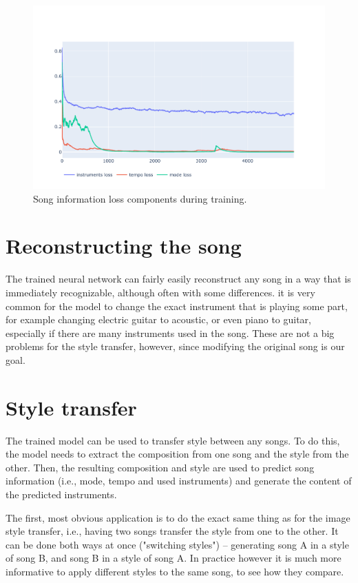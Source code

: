 \documentclass[en]{pracamgr}
\begin{document}
\begin{figure}
    \centering
    \includegraphics[width=\linewidth]{figures/song-info.pdf}
    \caption{Song information loss components during training.}
    \label{fig:song_info}
\end{figure}

\section{Reconstructing the song}

The trained neural network can fairly easily reconstruct any song in a way that is immediately recognizable, although often with some differences.
it is very common for the model to change the exact instrument that is playing some part, for example changing electric guitar to acoustic, or even piano to guitar, especially if there are many instruments used in the song.
These are not a big problems for the style transfer, however, since modifying the original song is our goal.

\section{Style transfer}

The trained model can be used to transfer style between any songs.
To do this, the model needs to extract the composition from one song and the style from the other.
Then, the resulting composition and style are used to predict song information (i.e., mode, tempo and used instruments) and generate the content of the predicted instruments.

The first, most obvious application is to do the exact same thing as for the image style transfer, i.e., having two songs transfer the style from one to the other.
It can be done both ways at once ("switching styles") -- generating song A in a style of song B, and song B in a style of song A.
In practice however it is much more informative to apply different styles to the same song, to see how they compare.
\end{document}
